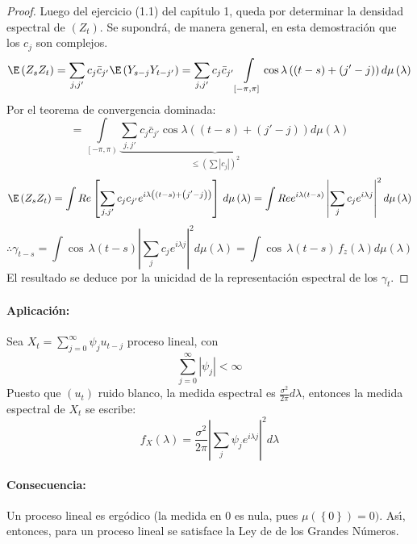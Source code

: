 \begin{proof}
 Luego del ejercicio (1.1) del cap\'{\i}tulo 1, queda por determinar la densidad espectral de $(Z_{{t}})$. Se supondr\'{a}, de manera general, en esta demostraci\'{o}n que los $c_{j}$ son complejos.
\[
\E\left( {Z_{s} Z_{t} } \right)=\sum_{j,j'} {c_{j} \bar{{c}}_{j'} \E\left( {Y_{s-j} Y_{t-j'} } \right)} =\sum_{j,j'} {c_{j} \bar{{c}}_{j'} } \int\limits_{\left[ {-\pi ,\pi } \right]} {\cos \lambda \left( {\left( {t-s} \right)+\left( {j'-j} \right)} \right)d\mu \left( \lambda \right)} 
\]
Por el teorema de convergencia dominada: 
\[
=\int\limits_{\left[ {-\pi ,\pi } \right)} {\underbrace {\sum_{j,j'} 
{c_{j} \bar{{c}}_{j'} \cos \lambda \left( {\left( {t-s} \right)+\left( 
{j'-j} \right)} \right)} }_{\le \left( {\sum {\left| {c_{j} } \right|} 
} \right)^{2}}} d\mu \left( \lambda \right)
\]
\[
\E\left( {Z_{s} Z_{t} } \right)=\int {Re\left[ {\sum_{j,j'} {c_{j} c_{j'} e^{i\lambda \left( {\left( {t-s} \right)+\left( {j'-j} \right)} \right)}} } \right]\,d\mu \left( \lambda \right)} =\int {Re e^{i\lambda \left( {t-s} \right)}\left| {\sum_j {c_{j} e^{i\lambda j}} } \right|^{2}d\mu \left( \lambda \right)} 
\]
\[
\therefore\gamma_{t-s} =\int {\cos \,\lambda \left( {t-s} \right)} \left| 
{\sum_j {c_{j} e^{i\lambda j}} } \right|^{2}d\mu \left( \lambda 
\right)=\int {\cos \,\lambda (t-s)\,f_{z} (\lambda )d\mu (\lambda )} 
\]
El resultado se deduce por la unicidad de la representaci\'{o}n espectral de los $\gamma_{t}$.
\end{proof}

\paragraph{Aplicaci\'{o}n: } Sea $X_{t} =\sum_{j=0}^\infty {\psi_{j } u_{t-j} } $ proceso lineal, con 
\[
\sum_{j=0}^\infty \left| \psi_{j} \right| <\infty 
\]
Puesto que $(u_{t})$ ruido blanco, la medida espectral es $\frac{\sigma^{2}}{2\pi }d\lambda$, entonces la medida espectral de $X_{t}$ se escribe:
\[
f_{X} \left( \lambda \right)=\frac{\sigma^{2}}{2\pi }\left| {\sum_j {\psi_{j} e^{i\lambda j}} } \right|^{2}d\lambda 
\]

\paragraph{Consecuencia: } Un proceso lineal es erg\'{o}dico (la medida en 0 es 
nula, pues $\mu \left( \left\{ 0 \right\} \right)=0)$. As\'{\i}, entonces, 
para un proceso lineal se satisface la Ley de de los Grandes N\'{u}meros.



